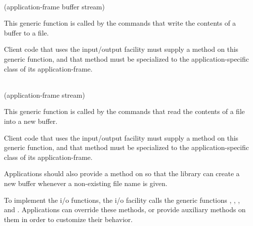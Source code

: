 \\
{(application-frame buffer stream)}

This generic function is called by the commands that write the
contents of a buffer to a file.

Client code that uses the \sysname{} input/output facility must supply
a method on this generic function, and that method must be specialized
to the application-specific class of its application-frame.

\\
{(application-frame stream)}

This generic function is called by the commands that read the
contents of a file into a new buffer.

Client code that uses the \sysname{} input/output facility must supply
a method on this generic function, and that method must be specialized
to the application-specific class of its application-frame.

Applications should also provide a method on
 so that the \sysname{}
library can create a new buffer whenever a non-existing file name is
given.

To implement the i/o functions, the \sysname{} i/o facility calls the
generic functions
,
,
, and
.  Applications can override these
methods, or provide auxiliary methods on them in order to customize
their behavior.
